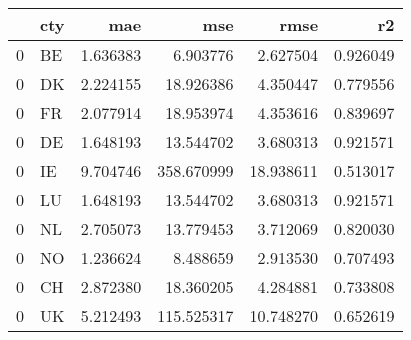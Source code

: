 \begin{tabular}{llrrrr}
\toprule
 & cty & mae & mse & rmse & r2 \\
\midrule
0 & BE & 1.636383 & 6.903776 & 2.627504 & 0.926049 \\
0 & DK & 2.224155 & 18.926386 & 4.350447 & 0.779556 \\
0 & FR & 2.077914 & 18.953974 & 4.353616 & 0.839697 \\
0 & DE & 1.648193 & 13.544702 & 3.680313 & 0.921571 \\
0 & IE & 9.704746 & 358.670999 & 18.938611 & 0.513017 \\
0 & LU & 1.648193 & 13.544702 & 3.680313 & 0.921571 \\
0 & NL & 2.705073 & 13.779453 & 3.712069 & 0.820030 \\
0 & NO & 1.236624 & 8.488659 & 2.913530 & 0.707493 \\
0 & CH & 2.872380 & 18.360205 & 4.284881 & 0.733808 \\
0 & UK & 5.212493 & 115.525317 & 10.748270 & 0.652619 \\
\bottomrule
\end{tabular}
